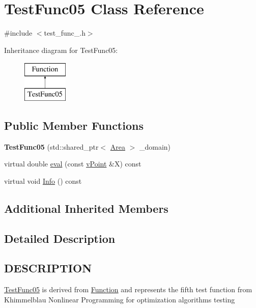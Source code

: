 \hypertarget{class_test_func05}{}\section{Test\+Func05 Class Reference}
\label{class_test_func05}


{\ttfamily \#include $<$test\+\_\+func\+\_.\+h$>$}

Inheritance diagram for Test\+Func05\+:\begin{figure}[H]
\begin{center}
\leavevmode
\includegraphics[height=2.000000cm]{class_test_func05}
\end{center}
\end{figure}
\subsection*{Public Member Functions}
\begin{DoxyCompactItemize}
\item 
\mbox{\label{class_test_func05_a06502e0a2ae738dbdb79904c9264a7de}} 
{\bfseries Test\+Func05} (std\+::shared\+\_\+ptr$<$ \hyperlink{class_area}{Area} $>$ \+\_\+domain)
\item 
virtual double \hyperlink{class_test_func05_a2848dbb9b76d0db3a701ce69ec700923}{eval} (const \hyperlink{classv_point}{v\+Point} \&X) const
\item 
virtual void \hyperlink{class_test_func05_a2a1c8696724c5195e92b4194d6205dcb}{Info} () const
\end{DoxyCompactItemize}
\subsection*{Additional Inherited Members}


\subsection{Detailed Description}
\hypertarget{function_8h_DESCRIPTION}{}\subsection{D\+E\+S\+C\+R\+I\+P\+T\+I\+ON}\label{function_8h_DESCRIPTION}
\hyperlink{class_test_func05}{Test\+Func05} is derived from \hyperlink{class_function}{Function} and represents the fifth test function from Khimmelblau \textquotesingle{}Nonlinear Programming\textquotesingle{} for optimization algorithms testing 

